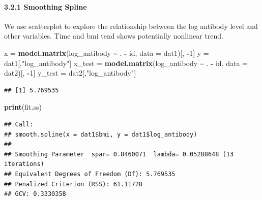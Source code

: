 \documentclass[
]{article}
\newenvironment{Shaded}{\begin{snugshade}}{\end{snugshade}}
\newcommand{\AttributeTok}[1]{\textcolor[rgb]{0.13,0.29,0.53}{#1}}
\newcommand{\CommentTok}[1]{\textcolor[rgb]{0.56,0.35,0.01}{\textit{#1}}}
\newcommand{\DecValTok}[1]{\textcolor[rgb]{0.00,0.00,0.81}{#1}}
\newcommand{\FunctionTok}[1]{\textcolor[rgb]{0.13,0.29,0.53}{\textbf{#1}}}
\newcommand{\NormalTok}[1]{#1}
\newcommand{\OtherTok}[1]{\textcolor[rgb]{0.56,0.35,0.01}{#1}}
\newcommand{\SpecialCharTok}[1]{\textcolor[rgb]{0.81,0.36,0.00}{\textbf{#1}}}
\newcommand{\StringTok}[1]{\textcolor[rgb]{0.31,0.60,0.02}{#1}}
\begin{document}
\paragraph{3.2.1 Smoothing Spline}\label{smoothing-spline}

We use scatterplot to explore the relationship between the log antibody
level and other variables. Time and bmi tend shows potentially nonlinear
trend.

\begin{Shaded}
\begin{Highlighting}[]
\NormalTok{x }\OtherTok{=} \FunctionTok{model.matrix}\NormalTok{(log\_antibody }\SpecialCharTok{\textasciitilde{}}\NormalTok{ . }\SpecialCharTok{{-}}\NormalTok{ id, }\AttributeTok{data =}\NormalTok{ dat1)[, }\SpecialCharTok{{-}}\DecValTok{1}\NormalTok{]}
\NormalTok{y }\OtherTok{=}\NormalTok{ dat1[,}\StringTok{"log\_antibody"}\NormalTok{]}
\NormalTok{x\_test }\OtherTok{=} \FunctionTok{model.matrix}\NormalTok{(log\_antibody }\SpecialCharTok{\textasciitilde{}}\NormalTok{ . }\SpecialCharTok{{-}}\NormalTok{ id, }\AttributeTok{data =}\NormalTok{ dat2)[, }\SpecialCharTok{{-}}\DecValTok{1}\NormalTok{]}
\NormalTok{y\_test }\OtherTok{=}\NormalTok{ dat2[,}\StringTok{"log\_antibody"}\NormalTok{]}
\end{Highlighting}
\end{Shaded}

\begin{Shaded}
\end{Shaded}

\begin{verbatim}
## [1] 5.769535
\end{verbatim}

\begin{Shaded}
\begin{Highlighting}[]
\FunctionTok{print}\NormalTok{(fit.ss)}
\end{Highlighting}
\end{Shaded}

\begin{verbatim}
## Call:
## smooth.spline(x = dat1$bmi, y = dat1$log_antibody)
## 
## Smoothing Parameter  spar= 0.8460071  lambda= 0.05288648 (13 iterations)
## Equivalent Degrees of Freedom (Df): 5.769535
## Penalized Criterion (RSS): 61.11728
## GCV: 0.3330358
\end{verbatim}
\end{document}
